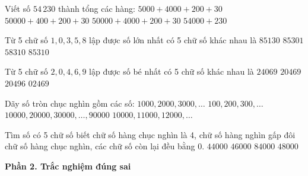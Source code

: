 \begin{ex} %
Viết số $54\,230$ thành tổng các hàng:
\choice
{$5000 + 4000 + 200 + 30$}
{$50000 + 400 + 200 + 30$}
{\True $50000 + 4000 + 200 + 30$}
{$54000 + 230$}
\end{ex}

\begin{ex} %
Từ 5 chữ số $1, 0, 3, 5, 8$ lập được số lớn nhất có 5 chữ số khác nhau là
\choice
{$85130$}
{$85301$}
{$58310$}
{\True $85310$}
\end{ex}

\begin{ex} %
Từ 5 chữ số $2, 0, 4, 6, 9$ lập được số bé nhất có 5 chữ số khác nhau là
\choice
{$24069$}
{\True $20469$}
{$20496$}
{$02469$}
\end{ex}

\begin{ex} %
Dãy số tròn chục nghìn gồm các số:
\choice
{$1000, 2000, 3000, \dots$}
{$100, 200, 300, \dots$}
{\True $10000, 20000, 30000, \dots, 90000$}
{$10000, 11000, 12000, \dots$}
\end{ex}

\begin{ex} %
Tìm số có 5 chữ số biết chữ số hàng chục nghìn là 4, chữ số hàng nghìn gấp đôi chữ số hàng chục nghìn, các chữ số còn lại đều bằng 0.
\choice
{$44000$}
{$46000$}
{$84000$}
{\True $48000$}
\end{ex}

\textbf{Phần 2. Trắc nghiệm đúng sai}

